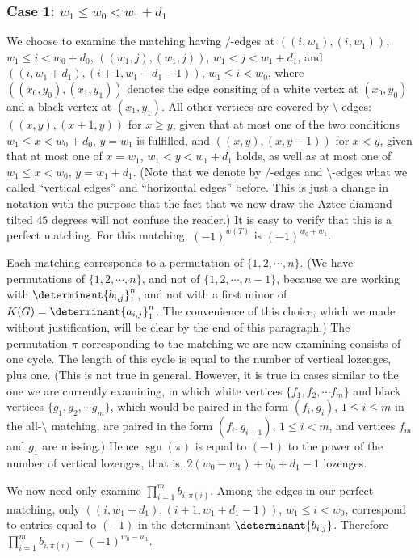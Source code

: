 \documentclass[10pt,reqno]{amsart}
\theoremstyle{plain}
\theoremstyle{definition}
\theoremstyle{remark}
\DeclareMathOperator{\sgn }{sgn }
\begin{document}
\subsubsection{Case 1: $w_1\leq w_0<w_1+d_1$}

We choose to examine the matching having $/$-edges at
$((i,w_1),(i,w_1))$, $w_1\leq i< w_0+d_0$, $((w_1,j),(w_1,j))$,
$w_1< j < w_1+d_1$, and $((i,w_1+d_1),(i+1,w_1+d_1-1))$, 
$w_1\leq i < w_0$, where $((x_0,y_0),(x_1,y_1))$ denotes the
edge consiting of a white vertex at $(x_0,y_0)$ and a black vertex
at $(x_1,y_1)$. All other vertices are covered by $\setminus$-edges:
$((x,y),(x+1,y))$ for $x\geq y$, given that at most one of the two
conditions $w_1\leq x <w_0+d_0$, $y = w_1$ is fulfilled, and
$((x,y),(x,y-1))$ for $x<y$, given that at most one of 
$x = w_1$, $w_1< y <w_1+d_1$ holds, as well as at most one of
$w_1\leq x < w_0$, $y = w_1+d_1$. (Note that we denote by
$/$-edges and $\setminus$-edges what we called ``vertical edges'' and
``horizontal edges'' before. This is just a change in notation with 
the purpose that the fact that we now draw the Aztec diamond tilted
$45$ degrees will not confuse the reader.)
It is easy to verify that this
is a perfect matching. For this matching, $(-1)^{w(T)}$ is 
$(-1)^{w_0+w_1}$. 

Each matching corresponds to a permutation of $\{1,2,\dotsb , n\}$.
(We have permutations of $\{1,2,\dotsb , n\}$, and not of 
$\{1,2,\dotsb , n-1\}$, because we are working with 
$\determinant{b_{i,j}}_1^n$, and not with a first minor of
$K(G)=\determinant{a_{i,j}}_1^n$. The convenience of this choice,
which we made without justification, will be clear by the end of this
paragraph.) The permutation $\pi$ corresponding
to the matching we are now examining consists of one cycle.
The length of this cycle is equal to the number of vertical lozenges, plus 
one.
(This is not true in general. However, it is
true in cases similar to the one we are currently examining, in which
white vertices $\{ f_1,f_2,\dotsb f_m\} $ and
black vertices $\{ g_1,g_2,\dotsb g_m\} $, which would be paired
in the form $(f_i,g_i)$, $1\leq i\leq m$ in the all-$\setminus$  matching, are
paired in the form $(f_i,g_{i+1})$, $1\leq i<m$, and vertices
$f_m$ and $g_1$ are missing.) Hence $\sgn(\pi)$ is equal to $(-1)$
to the power of the number of vertical lozenges, that is, 
$2(w_0-w_1)+d_0+d_1-1$ lozenges.

We now need only examine $\prod_{i=1}^m b_{i,\pi(i)}$. Among the edges
in our perfect matching, only $((i,w_1+d_1),(i+1,w_1+d_1-1))$,
$w_1\leq i<w_0$, correspond to entries equal to $(-1)$ in the determinant
$\determinant{b_{i,j}}$. Therefore $\prod_{i=1}^m b_{i,\pi(i)} = (-1)^{w_0-w_1}$.
\end{document}
